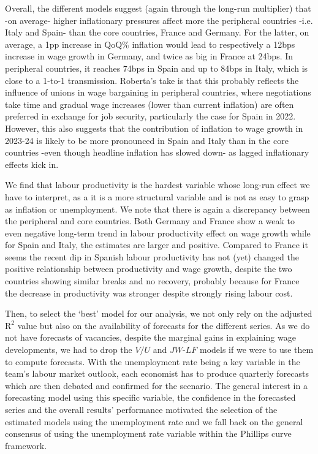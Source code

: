 Overall, the different models suggest (again through the long-run multiplier) that -on average- higher inflationary pressures affect more the peripheral countries -i.e. Italy and Spain- than the core countries, France and Germany. 
For the latter, on average, a 1pp increase in QoQ\% inflation would lead to respectively a 12bps increase in wage growth in Germany, and twice as big in France at 24bps. 
In peripheral countries, it reaches 74bps in Spain and up to 84bps in Italy, which is close to a 1-to-1 transmission. 
Roberta’s take is that this probably reflects the influence of unions in wage bargaining in peripheral countries, where negotiations take time and gradual wage increases (lower than current inflation) are often preferred in exchange for job security, particularly the case for Spain in 2022. 
However, this also suggests that the contribution of inflation to wage growth in 2023-24 is likely to be more pronounced in Spain and Italy than in the core countries -even though headline inflation has slowed down- as lagged inflationary effects kick in.

We find that labour productivity is the hardest variable whose long-run effect we have to interpret, as a it is a more structural variable and is not as easy to grasp as inflation or unemployment. 
We note that there is again a discrepancy between the peripheral and core countries. 
Both Germany and France show a weak to even negative long-term trend in labour productivity effect on wage growth while for Spain and Italy, the estimates are larger and positive. 
Compared to France it seems the recent dip in Spanish labour productivity has not (yet) changed the positive relationship between productivity and wage growth, despite the two countries showing similar breaks and no recovery, probably because for France the decrease in productivity was stronger despite strongly rising labour cost.

Then, to select the ‘best’ model for our analysis, we not only rely on the adjusted $\textrm{R}^{2}$ value but also on the availability of forecasts for the different series. 
As we do not have forecasts of vacancies, despite the marginal gains in explaining wage developments, we had to drop the $V/U$ and $JW\textrm{-}LF$ models if we were to use them to compute forecasts. 
With the unemployment rate being a key variable in the team’s labour market outlook, each economist has to produce quarterly forecasts which are then debated and confirmed for the scenario. 
The general interest in a forecasting model using this specific variable, the confidence in the forecasted series and the overall results’ performance motivated the selection of the estimated models using the unemployment rate and we fall back on the general consensus of using the unemployment rate variable within the Phillips curve framework.

